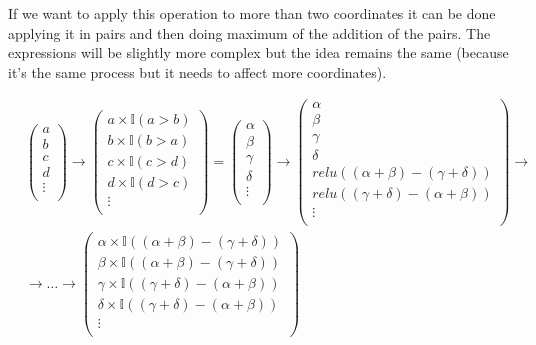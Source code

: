 If we want to apply this operation to more than two coordinates it can be done applying it in pairs and then doing maximum of the addition of the pairs. The expressions will be slightly more complex but the idea remains the same (because it's the same process but it needs to affect more coordinates).



\begin{align*}
    & \left( \begin{matrix} a \\ b \\ c \\ d \\ \vdots \\ \end{matrix} \right)
    \rightarrow
    \left( \begin{matrix} a \times \mathbb{I}(a>b) \\ b \times \mathbb{I}(b>a) \\ c \times \mathbb{I}(c>d) \\ d \times \mathbb{I}(d>c) \\ \vdots \\ \end{matrix} \right)
    = \left( \begin{matrix} \alpha \\ \beta \\ \gamma \\ \delta \\ \vdots \\ \end{matrix} \right)
    \rightarrow
    \left(\begin{matrix}
        \alpha \\ \beta \\ \gamma \\ \delta \\ 
        relu((\alpha + \beta) - (\gamma + \delta)) \\
        relu((\gamma + \delta) - (\alpha + \beta)) \\       
        \vdots \\
    \end{matrix}\right)
    \rightarrow \\ &\rightarrow
    \dots \rightarrow
    \left( \begin{matrix} 
        \alpha \times \mathbb{I}((\alpha + \beta) - (\gamma + \delta)) \\ 
        \beta  \times \mathbb{I}((\alpha + \beta) - (\gamma + \delta)) \\ 
        \gamma \times \mathbb{I}((\gamma + \delta) - (\alpha + \beta)) \\ 
        \delta \times \mathbb{I}((\gamma + \delta) - (\alpha + \beta)) \\ 
        \vdots \\ 
    \end{matrix} \right)
\end{align*}


